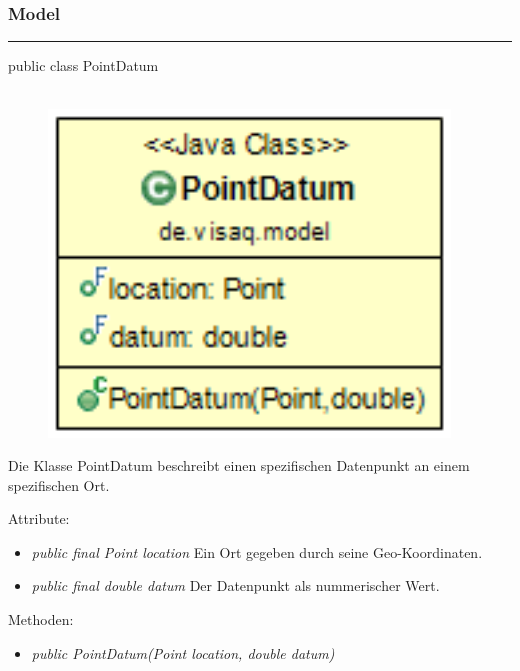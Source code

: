 \subsubsection{Model}
\newpage



\rule{\textwidth}{0.4pt}
public class PointDatum
\\\\
\begin{minipage}{0.25\textwidth}
    \begin{figure}[H]
        {\centering\includegraphics[width=0.95\textwidth]{media/backend/modell/classes/PointDatum.png}}
    \end{figure}
    \end{minipage} \hfill
\begin{minipage}{0.75\textwidth}
    Die Klasse PointDatum beschreibt einen spezifischen Datenpunkt an einem spezifischen Ort.
\end{minipage}

Attribute:
\begin{itemize}
    \item \emph{public final Point location} Ein Ort gegeben durch seine Geo-Koordinaten.
    \item \emph{public final double datum} Der Datenpunkt als nummerischer Wert.
\end{itemize}
Methoden:
\begin{itemize}
    \item \emph{public PointDatum(Point location, double datum)}
\end{itemize}

